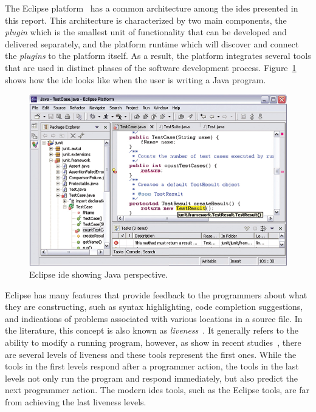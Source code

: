 The Eclipse platform~\cite{DesRivieres2004} has a common architecture among the \ac{ide}s presented in this report. This architecture is characterized by two main components, the \textit{plugin} which is the smallest unit of functionality that can be developed and delivered separately, and the platform runtime which will discover and connect the \textit{plugins} to the platform itself. As a result, the platform integrates several tools that are used in distinct phases of the software development process. Figure~\ref{fig:eclipse} shows how the \ac{ide} looks like when the user is writing a Java program. 

\begin{figure}[!htbp]
\vspace{-5pt}
  \centering
  \includegraphics[width=1.0\textwidth]{img/eclipse}
    \vspace{-15pt}
    \caption{Eclipse \ac{ide} showing Java perspective.}
    \vspace{-5pt}  
  \label{fig:eclipse}
\end{figure} 

Eclipse has many features that provide feedback to the programmers about what they are constructing, such as syntax highlighting, code completion suggestions, and indications of problems associated with various locations in a source file. In the literature, this concept is also known as \textit{liveness}~\cite{alpern1985defining}. It generally refers to the ability to modify a running program, however, as show in recent studies~\cite{tanimoto2013perspective}, there are several levels of liveness and these tools represent the first ones. While the tools in the first levels respond after a programmer action, the tools in the last levels not only run the program and respond immediately, but also predict the next programmer action. The modern \ac{ide}s tools, such as the Eclipse tools, are far from achieving the last liveness levels.

